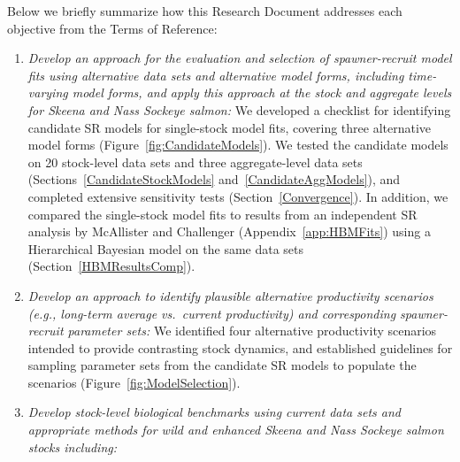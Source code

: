 \documentclass[french,11pt]{book}
\begin{document}
Below we briefly summarize how this Research Document addresses each objective from the Terms of Reference:
\begin{enumerate}
\def\labelenumi{\arabic{enumi}.}

\item
  \emph{Develop an approach for the evaluation and selection of spawner-recruit model fits using alternative data sets and alternative model forms, including time-varying model forms, and apply this approach at the stock and aggregate levels for Skeena and Nass Sockeye salmon:} We developed a checklist for identifying candidate SR models for single-stock model fits, covering three alternative model forms (Figure~\ref{fig:CandidateModels}). We tested the candidate models on 20 stock-level data sets and three aggregate-level data sets (Sections~\ref{CandidateStockModels} and~\ref{CandidateAggModels}), and completed extensive sensitivity tests (Section~\ref{Convergence}). In addition, we compared the single-stock model fits to results from an independent SR analysis by McAllister and Challenger (Appendix~\ref{app:HBMFits}) using a Hierarchical Bayesian model on the same data sets (Section~\ref{HBMResultsComp}).
\item
  \emph{Develop an approach to identify plausible alternative productivity scenarios (e.g., long-term average vs.~current productivity) and corresponding spawner-recruit parameter sets:} We identified four alternative productivity scenarios intended to provide contrasting stock dynamics, and established guidelines for sampling parameter sets from the candidate SR models to populate the scenarios (Figure~\ref{fig:ModelSelection}).
\item
  \emph{Develop stock-level biological benchmarks using current data sets and appropriate methods for wild and enhanced Skeena and Nass Sockeye salmon stocks including:}
  \begin{enumerate}
  \def\labelenumii{\alph{enumii}.}


\end{enumerate}
\end{enumerate}
\end{document}
